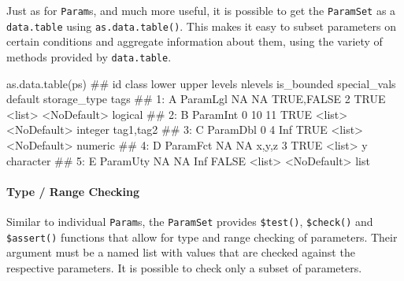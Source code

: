 \documentclass[
  11pt,
  parskip=half,
  DIV=calc,
  BCOR=10mm,
  x11names]{scrbook}
\newenvironment{Shaded}{}{}
\newcommand{\DataTypeTok}[1]{#1}
\newcommand{\DecValTok}[1]{#1}
\newcommand{\KeywordTok}[1]{\textcolor[rgb]{0.00,0.00,1.00}{#1}}
\newcommand{\NormalTok}[1]{#1}
\newcommand{\OperatorTok}[1]{#1}
\newcommand{\OtherTok}[1]{\textcolor[rgb]{1.00,0.25,0.00}{#1}}
\begin{document}
Just as for \texttt{Param}s, and much more useful, it is possible to get the \texttt{ParamSet} as a \texttt{data.table} using \texttt{as.data.table()}.
This makes it easy to subset parameters on certain conditions and aggregate information about them, using the variety of methods provided by \texttt{data.table}.

\begin{Shaded}
\begin{Highlighting}[]
\KeywordTok{as.data.table}\NormalTok{(ps)}
\NormalTok{##    id    class lower upper      levels nlevels is_bounded special_vals     default storage_type      tags}
\NormalTok{## 1:  A ParamLgl    NA    NA  TRUE,FALSE       2       TRUE       <list> <NoDefault>      logical          }
\NormalTok{## 2:  B ParamInt     0    10                  11       TRUE       <list> <NoDefault>      integer tag1,tag2}
\NormalTok{## 3:  C ParamDbl     0     4                 Inf       TRUE       <list> <NoDefault>      numeric          }
\NormalTok{## 4:  D ParamFct    NA    NA       x,y,z       3       TRUE       <list>           y    character          }
\NormalTok{## 5:  E ParamUty    NA    NA                 Inf      FALSE       <list> <NoDefault>         list}
\end{Highlighting}
\end{Shaded}

\hypertarget{type-range-checking-1}{%
\paragraph{Type / Range Checking}\label{type-range-checking-1}}

Similar to individual \texttt{Param}s, the \texttt{ParamSet} provides \texttt{\$test()}, \texttt{\$check()} and \texttt{\$assert()} functions that allow for type and range checking of parameters.
Their argument must be a named list with values that are checked against the respective parameters.
It is possible to check only a subset of parameters.

\begin{Shaded}
\end{Shaded}
\end{document}
